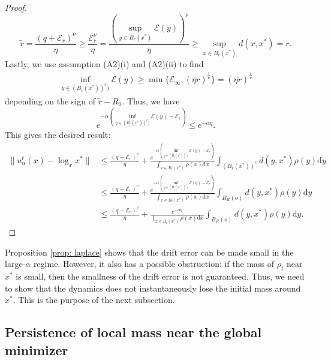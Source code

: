 \documentclass[11pt]{amsart}
\def\d{\mathrm{d}}
\begin{document}
\begin{proof}
\[
\tilde r = \frac{(q+\mathcal E_r)^\nu}{\eta} \geq \frac{\mathcal E_r^\nu}{\eta} = \frac{  (  \sup_{y\in B_r(x^*)} \mathcal E(y)      )^\nu    }{\eta} \geq \sup_{x\in B_r(x^*)} d(x,x^*)=r.
\]
Lastly, we use assumption (A2)(i) and (A2)(ii) to find 
\begin{align*}
  \inf_{y\in (B_{\tilde r}(x^*))^c ) } \mathcal E(y)   \geq \min\{\mathcal E_\infty, (\eta \tilde r)^\frac1\nu\} = (\eta\tilde r)^\frac1\nu
\end{align*}
depending on the sign of $\tilde r-R_0$. Thus, we have
\[
e^{-\alpha (  \inf_{y\in (B_{\tilde r}(x^*))^c ) } \mathcal E(y) - \mathcal E_r)} \leq e^{-\alpha q}.
\]
This gives the desired result:
\begin{align*}
\|u_\alpha^t(x)-\log_xx^* \| &\leq \frac{(q+\mathcal E_r)^\nu}{\eta}+ \frac{  e^{-\alpha (  \inf_{y\in (B_{\tilde r}(x^*))^c ) } \mathcal E(y) - \mathcal E_r) }}{  \int_{x\in B_r(x^*)} \rho(x) \d x    } \int_{(B_{\tilde{r}}(x^*))^c} d(y,x^*) \rho(y) \d y  \\
&\leq\frac{(q+\mathcal E_r)^\nu}{\eta} + \frac{  e^{-\alpha (  \inf_{y\in (B_{\tilde r}(x^*))^c ) } \mathcal E(y) - \mathcal E_r) }}{  \int_{x\in B_r(x^*)} \rho(x) \d x    } \int_{ B_R(o)} d(y,x^*) \rho(y) \d y\\
&\leq\frac{(q+\mathcal E_r)^\nu}{\eta} + \frac{  e^{-\alpha q }}{  \int_{x\in B_r(x^*)} \rho(x) \d x    } \int_{ B_R(o)} d(y,x^*) \rho(y) \d y.
\end{align*}
\end{proof}



 

Proposition \ref{prop: laplace} shows that the drift error can be made small in the large-$\alpha$ regime. However, it also has a possible obstruction: if the mass of $\rho_t$ near $x^*$ is small, then the smallness of the drift error is not guaranteed. Thus, we need to show that the dynamics does not instantaneously lose the initial mass around $x^*$. This is the purpose of the next subsection.



 
\subsection{Persistence of local mass near the global minimizer}
\end{document}
